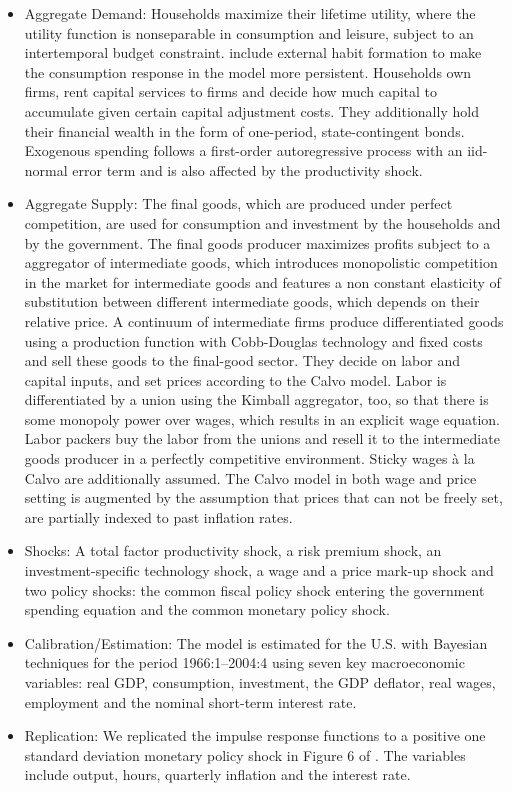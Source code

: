 \documentclass[11pt,a4paper]{article}
\begin{document}
	\begin{itemize}
		\item Aggregate Demand: Households maximize their lifetime utility, where the utility function is nonseparable in consumption and leisure, subject to an intertemporal budget constraint. \cite{SmetsWouters2007} include external habit formation to make the consumption response in the model more persistent. Households own firms, rent capital services to firms and decide how much capital to accumulate given certain capital adjustment costs. They additionally hold their financial wealth in the form of one-period, state-contingent bonds. Exogenous spending follows a first-order autoregressive process with an iid-normal error term and is also affected by the productivity shock.
		\item Aggregate Supply: The final goods, which are produced under perfect competition, are used for consumption and investment by the households and by the government. The final goods producer maximizes profits subject to a \cite{Kimball1995} aggregator of intermediate goods, which introduces monopolistic competition in the market for intermediate goods and features a non constant elasticity of substitution between different intermediate goods, which depends on their relative price. A continuum of intermediate firms produce differentiated goods using a production function with Cobb-Douglas technology and fixed costs and sell these goods to the final-good sector. They decide on labor and capital inputs, and set prices according to the Calvo model. Labor is differentiated by a union using the Kimball aggregator, too, so that there is some monopoly power over wages, which results in an explicit wage equation. Labor packers buy the labor from the unions and resell it to the intermediate goods producer in a perfectly competitive environment. Sticky wages \`{a} la Calvo are additionally assumed. The Calvo model in both wage and price setting is augmented by the assumption that prices that can not be freely set, are partially indexed to past inflation rates.
		\item Shocks: A total factor productivity shock, a risk premium shock, an investment-specific technology shock, a wage and a price mark-up shock and two policy shocks: the common fiscal policy shock entering the government spending equation and the common monetary policy shock.
		\item Calibration/Estimation: The model is estimated for the U.S. with Bayesian techniques for the period 1966:1--2004:4 using seven key macroeconomic variables: real GDP, consumption, investment, the GDP deflator, real wages, employment and the nominal short-term interest rate.
		\item Replication: We replicated the impulse response functions to a positive one standard deviation monetary policy shock in Figure 6 of \cite{SmetsWouters2007}. The variables include output, hours, quarterly inflation and the interest rate.
		

\end{itemize}
\end{document}
